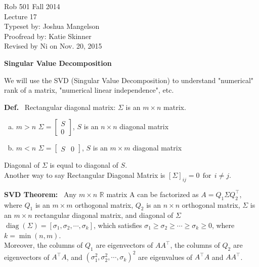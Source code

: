 \documentclass[letterpaper]{article}
\newcommand{\real}{\mathbb R}  %
\begin{document}
\baselineskip=48pt  %


\setlength{\parskip}{.3in}
\setlength{\itemsep}{.3in}

\pagestyle{plain}

{\Large \bf
\begin{center}
Rob 501 Fall 2014\\
Lecture 17\\
Typeset by:  Joshua Mangelson\\
Proofread by: Katie Skinner\\
Revised by Ni on Nov. 20, 2015
\end{center}
}

\Large

\begin{center}\textbf{Singular Value Decomposition}\end{center}

We will use the SVD (Singular Value Decomposition) to understand "numerical" rank of a matrix, "numerical linear independence", etc.

\textbf{Def.}~ Rectangular diagonal matrix: $\Sigma$ is an $m \times n$ matrix.
    \begin{enumerate}[a)]
        \item  $m > n$  \;\;\;  $\Sigma = \left[ \begin{array}{c} S \\ 0 \end{array} \right]$,  $S$ is an $n \times n$ diagonal matrix
        \item $m < n$ \;\;\; $\Sigma = \left[ \begin{array}{cc} S & 0 \end{array} \right]$,  $S$ is an $m \times m$ diagonal matrix
    \end{enumerate}
    \noindent
    Diagonal of $\Sigma$ is equal to diagonal of $ S $.\\
    Another way to say Rectangular Diagonal Matrix is $\left[ \Sigma \right]_{ij} = 0~~\text{for}~~ i \ne j$.

\noindent \textbf{SVD Theorem:}~ Any $m \times n$ $\real$ matrix A can be factorized as $A = Q_1 \Sigma Q_2^\top$, where $Q_1$ is an $m \times m$ orthogonal matrix, $Q_2$ is an $n \times n$ orthogonal matrix, $\Sigma$ is an $m \times n$ rectangular diagonal matrix, and diagonal of $\Sigma$ $\operatorname{diag}(\Sigma) = \left[ \sigma_1, \sigma_2, \dotsb , \sigma_k \right]$, which satisfies $ \sigma_1 \ge \sigma_2 \ge \dotsb  \ge \sigma_k \ge 0$, where $k=\operatorname{min}(n,m)$.\\
    Moreover, the columns of $Q_1$ are eigenvectors of $AA^\top$, the columns of $Q_2$ are eigenvectors of $A^\top A$, and $(\sigma_1^2, \sigma_2^2, \dotsb , \sigma_k)^2$ are eigenvalues of $A^\top A$ and $AA^\top$.
\end{document}
